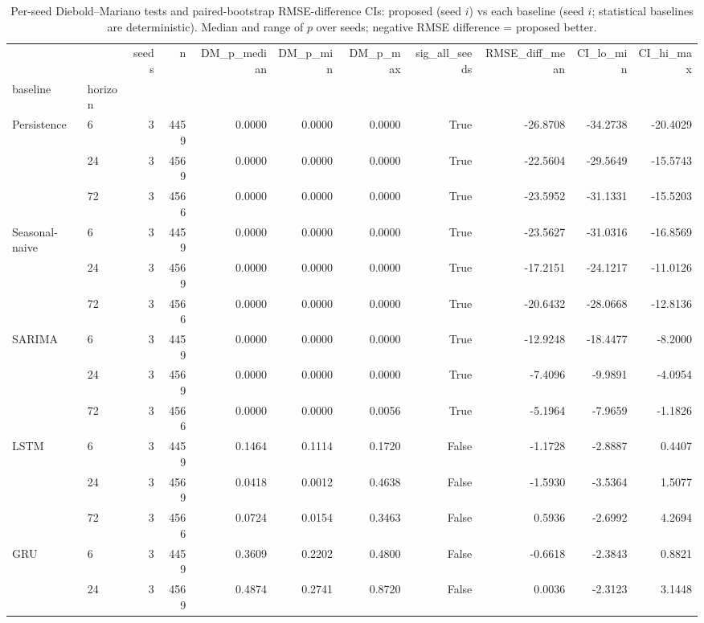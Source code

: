 \begin{table}
\caption{Per-seed Diebold--Mariano tests and paired-bootstrap RMSE-difference CIs: proposed (seed $i$) vs each baseline (seed $i$; statistical baselines are deterministic). Median and range of $p$ over seeds; negative RMSE difference = proposed better.}
\label{tab:significance}
\begin{tabular}{llrrrrrrrrr}
\toprule
 &  & seeds & n & DM\_p\_median & DM\_p\_min & DM\_p\_max & sig\_all\_seeds & RMSE\_diff\_mean & CI\_lo\_min & CI\_hi\_max \\
baseline & horizon &  &  &  &  &  &  &  &  &  \\
\midrule
\multirow[t]{3}{*}{Persistence} & 6 & 3 & 4459 & 0.0000 & 0.0000 & 0.0000 & True & -26.8708 & -34.2738 & -20.4029 \\
 & 24 & 3 & 4569 & 0.0000 & 0.0000 & 0.0000 & True & -22.5604 & -29.5649 & -15.5743 \\
 & 72 & 3 & 4566 & 0.0000 & 0.0000 & 0.0000 & True & -23.5952 & -31.1331 & -15.5203 \\
\cline{1-11}
\multirow[t]{3}{*}{Seasonal-naive} & 6 & 3 & 4459 & 0.0000 & 0.0000 & 0.0000 & True & -23.5627 & -31.0316 & -16.8569 \\
 & 24 & 3 & 4569 & 0.0000 & 0.0000 & 0.0000 & True & -17.2151 & -24.1217 & -11.0126 \\
 & 72 & 3 & 4566 & 0.0000 & 0.0000 & 0.0000 & True & -20.6432 & -28.0668 & -12.8136 \\
\cline{1-11}
\multirow[t]{3}{*}{SARIMA} & 6 & 3 & 4459 & 0.0000 & 0.0000 & 0.0000 & True & -12.9248 & -18.4477 & -8.2000 \\
 & 24 & 3 & 4569 & 0.0000 & 0.0000 & 0.0000 & True & -7.4096 & -9.9891 & -4.0954 \\
 & 72 & 3 & 4566 & 0.0000 & 0.0000 & 0.0056 & True & -5.1964 & -7.9659 & -1.1826 \\
\cline{1-11}
\multirow[t]{3}{*}{LSTM} & 6 & 3 & 4459 & 0.1464 & 0.1114 & 0.1720 & False & -1.1728 & -2.8887 & 0.4407 \\
 & 24 & 3 & 4569 & 0.0418 & 0.0012 & 0.4638 & False & -1.5930 & -3.5364 & 1.5077 \\
 & 72 & 3 & 4566 & 0.0724 & 0.0154 & 0.3463 & False & 0.5936 & -2.6992 & 4.2694 \\
\cline{1-11}
\multirow[t]{3}{*}{GRU} & 6 & 3 & 4459 & 0.3609 & 0.2202 & 0.4800 & False & -0.6618 & -2.3843 & 0.8821 \\
 & 24 & 3 & 4569 & 0.4874 & 0.2741 & 0.8720 & False & 0.0036 & -2.3123 & 3.1448 \\

\end{tabular}
\end{table}
